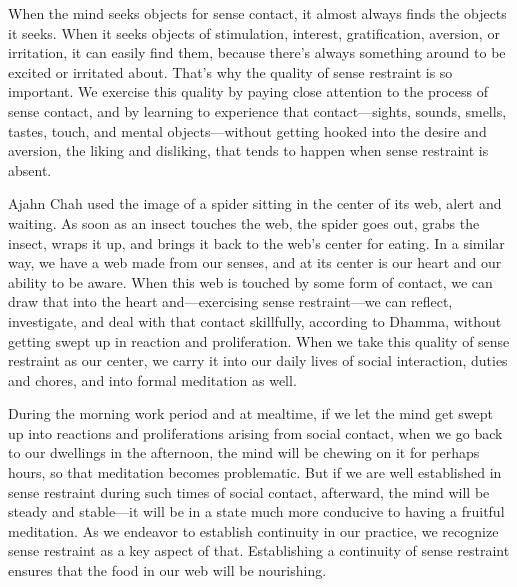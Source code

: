 
When the mind seeks objects for sense contact, it almost always finds 
the objects it seeks. When it seeks objects of stimulation, interest, 
gratification, aversion, or irritation, it can easily find them, 
because there's always something around to be excited or irritated 
about. That's why the quality of sense restraint is so important. We 
exercise this quality by paying close attention to the process of sense 
contact, and by learning to experience that contact---sights, sounds, 
smells, tastes, touch, and mental objects---without getting hooked into 
the desire and aversion, the liking and disliking, that tends to happen 
when sense restraint is absent.

Ajahn Chah used the image of a spider sitting in the center of its web, 
alert and waiting. As soon as an insect touches the web, the spider 
goes out, grabs the insect, wraps it up, and brings it back to the 
web's center for eating. In a similar way, we have a web made from our 
senses, and at its center is our heart and our ability to be aware. 
When this web is touched by some form of contact, we can draw that into 
the heart and---exercising sense restraint---we can reflect, 
investigate, and deal with that contact skillfully, according to 
Dhamma, without getting swept up in reaction and proliferation. When we 
take this quality of sense restraint as our center, we carry it into 
our daily lives of social interaction, duties and chores, and into 
formal meditation as well.

During the morning work period and at mealtime, if we let the mind get 
swept up into reactions and proliferations arising from social contact, 
when we go back to our dwellings in the afternoon, the mind will be 
chewing on it for perhaps hours, so that meditation becomes 
problematic. But if we are well established in sense restraint during 
such times of social contact, afterward, the mind will be steady and 
stable---it will be in a state much more conducive to having a fruitful 
meditation. As we endeavor to establish continuity in our practice, we 
recognize sense restraint as a key aspect of that. Establishing a 
continuity of sense restraint ensures that the food in our web will be 
nourishing.


